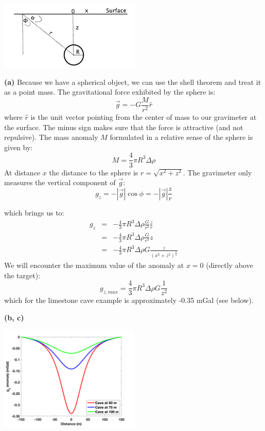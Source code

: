 \ifanswers
    \begin{tcolorbox}[enhanced jigsaw,breakable,pad at break*=1mm,
    colback=blue!5!white,colframe=babyblueeyes,title=Solutions]
     \begin{center}
       \includegraphics[width=0.5\textwidth]{Figures/Gravimetry/Gravimetry01_SphereSketchSolutions.png}
    \end{center}
    \textbf{(a)} Because we have a spherical object, we can use the shell theorem and treat it as a point mass. The gravitational force exhibited by the sphere is:
    $$
    \vec{g} = -G\frac{M}{r^2}\hat{r}
    $$
    where $\hat{r}$ is the unit vector pointing from the center of mass to our gravimeter at the surface. The minus sign makes sure that the force is attractive (and not repulsive). The mass anomaly $M$ formulated in a relative sense of the sphere is given by:
    $$
    M = \frac{4}{3}\pi R^3 \Delta \rho
    $$
    At distance $x$ the distance to the sphere is $r=\sqrt{x^2+z^2}$. The gravimeter only measures the vertical component of $\vec{g}$:
    $$
    g_z = -|\vec{g}|\cos\phi = -|\vec{g}|\frac{z}{r}
    $$
  
    which brings us to:
    \begin{eqnarray*}
    g_z &=& -\frac{4}{3}\pi R^3 \Delta \rho \frac{G}{r^2} \frac{z}{r} \\
        &=& -\frac{4}{3}\pi R^3 \Delta \rho \frac{G}{r^3} z \\
        &=& -\frac{4}{3}\pi R^3 \Delta \rho G \frac{z}{(x^2+z^2)^\frac{3}{2}}
    \end{eqnarray*}
    We will encounter the maximum value of the anomaly at $x = 0$ (directly above the target):
    $$
    g_{z,max} = \frac{4}{3}\pi R^3 \Delta \rho G \frac{1}{z^2}
    $$
    which for the limestone cave example is approximately -0.35 mGal (see below).
    

    \textbf{(b, c)}
    
    \begin{center}
        \includegraphics[width=0.5\textwidth]{Figures/Gravimetry/Gravimetry01_Visualization.png}
    \end{center}
 

\end{tcolorbox}
